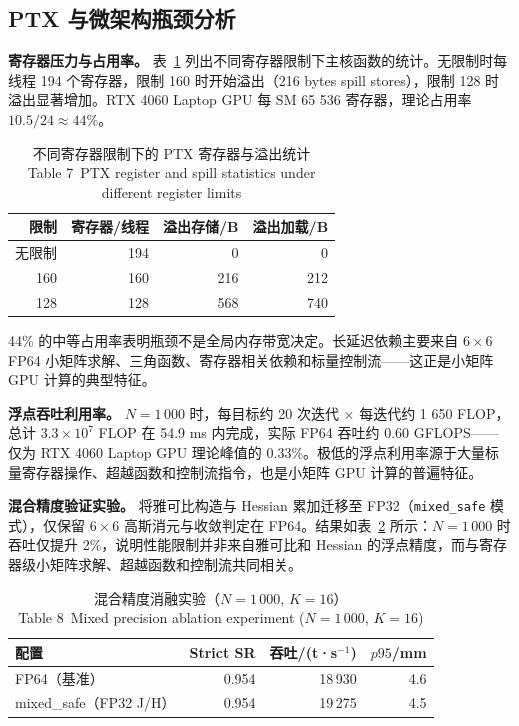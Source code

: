 \documentclass[twocolumn,a4paper,10pt]{ctexart}
\begin{document}
\subsection{PTX 与微架构瓶颈分析}

\textbf{寄存器压力与占用率。} 表~\ref{tab:regs} 列出不同寄存器限制下主核函数的统计。无限制时每线程 194 个寄存器，限制 160 时开始溢出（216 bytes spill stores），限制 128 时溢出显著增加。RTX 4060 Laptop GPU 每 SM 65 536 寄存器，理论占用率 $10.5/24\approx44\%$。

\begin{table}[htbp]
\centering
\caption{不同寄存器限制下的 PTX 寄存器与溢出统计\\[2pt] {\small Table 7~PTX register and spill statistics under different register limits}}
\label{tab:regs}
\footnotesize
\setlength{\tabcolsep}{4pt}
\begin{tabular}{rrrr}
\toprule
限制 & 寄存器/线程 & 溢出存储/B & 溢出加载/B\\
\midrule
无限制 & 194 & 0 & 0\\
160 & 160 & 216 & 212\\
128 & 128 & 568 & 740\\
\bottomrule
\end{tabular}
\end{table}

44\% 的中等占用率表明瓶颈不是全局内存带宽决定。长延迟依赖主要来自 $6\times6$ FP64 小矩阵求解、三角函数、寄存器相关依赖和标量控制流——这正是小矩阵 GPU 计算的典型特征。

\textbf{浮点吞吐利用率。} $N=1\,000$ 时，每目标约 20 次迭代 $\times$ 每迭代约 1 650 FLOP，总计 $3.3\times10^7$ FLOP 在 54.9 ms 内完成，实际 FP64 吞吐约 0.60 GFLOPS——仅为 RTX 4060 Laptop GPU 理论峰值的 0.33\%。极低的浮点利用率源于大量标量寄存器操作、超越函数和控制流指令，也是小矩阵 GPU 计算的普遍特征。

\textbf{混合精度验证实验。} 将雅可比构造与 Hessian 累加迁移至 FP32（\texttt{mixed\_safe} 模式），仅保留 $6\times6$ 高斯消元与收敛判定在 FP64。结果如表~\ref{tab:mixed} 所示：$N=1\,000$ 时吞吐仅提升 2\%，说明性能限制并非来自雅可比和 Hessian 的浮点精度，而与寄存器级小矩阵求解、超越函数和控制流共同相关。

\begin{table}[htbp]
\centering
\caption{混合精度消融实验（$N=1\,000$, $K=16$）\\[2pt] {\small Table 8~Mixed precision ablation experiment ($N=1\,000$, $K=16$)}}
\label{tab:mixed}
\scriptsize
\setlength{\tabcolsep}{3pt}
\begin{tabular}{lrrr}
\toprule
配置 & Strict SR & 吞吐/(t·s$^{-1}$) & $p95$/mm\\
\midrule
FP64（基准） & 0.954 & 18\,930 & 4.6\\
mixed\_safe（FP32 J/H） & 0.954 & 19\,275 & 4.5\\
\bottomrule
\end{tabular}
\end{table}
\end{document}
